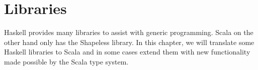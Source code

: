 \chapter{Libraries}
\label{libraries}

Haskell provides many libraries to assist with generic programming. Scala on
the other hand only has the Shapeless library. In this chapter, we will
translate some Haskell libraries to Scala and in some cases extend them with
new functionality made possible by the Scala type system.





